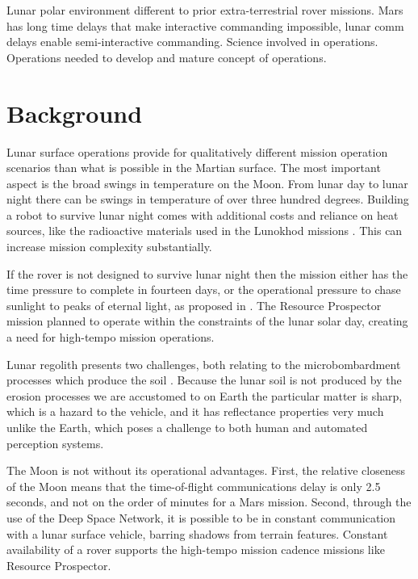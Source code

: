 \documentclass[twocolumn,letterpaper]{IEEEAerospaceCLS}  %
\begin{document}
Lunar polar environment different to prior extra-terrestrial rover missions. Mars has long time delays that make interactive commanding impossible, lunar comm delays enable semi-interactive commanding. Science involved in operations. Operations needed to develop and mature concept of operations.  

\section{Background}


Lunar surface operations provide for qualitatively different mission operation scenarios than what is possible in the Martian surface.  The most important aspect is the broad swings in temperature on the Moon.  From lunar day to lunar night there can be swings in temperature of over three hundred degrees.  Building a robot to survive lunar night comes with additional costs and reliance on heat sources, like the radioactive materials used in the Lunokhod missions \cite{XXX}.  This can increase mission complexity substantially.  

If the rover is not designed to survive lunar night then the mission either has the time pressure to complete in fourteen days, or the operational pressure to chase sunlight to peaks of eternal light, as proposed in \cite{otten2018strategic}.  The Resource Prospector mission planned to operate within the constraints of the lunar solar day, creating a need for high-tempo mission operations. 

Lunar regolith presents two challenges, both relating to the microbombardment processes which produce the soil \cite{XXX}.  Because the lunar soil is not produced by the erosion processes we are accustomed to on Earth the particular matter is sharp, which is a hazard to the vehicle, and it has reflectance properties very much unlike the Earth, which poses a challenge to both human and automated perception systems. 

The Moon is not without its operational advantages.  First, the relative closeness of the Moon means that the time-of-flight communications delay is only 2.5 seconds, and not on the order of minutes for a Mars mission.  Second, through the use of the Deep Space Network, it is possible to be in constant communication with a lunar surface vehicle, barring shadows from terrain features.  Constant availability of a rover supports the high-tempo mission cadence missions like Resource Prospector.
\end{document}
